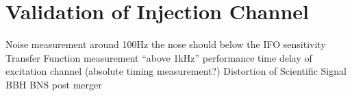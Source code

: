 




\chapter{Validation of Injection Channel}
Noise measurement
around 100Hz  the nose should below the IFO sensitivity
Transfer Function measurement
“above 1kHz” performance
time delay of excitation channel
(absolute timing measurement?)
Distortion of Scientific Signal
BBH
BNS post merger



